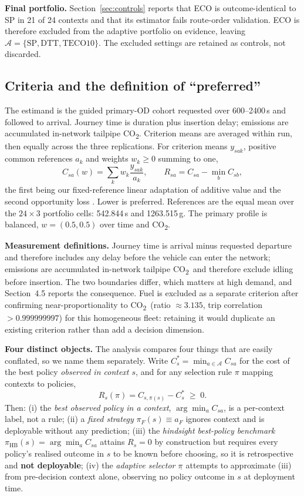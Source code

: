 \documentclass[10pt,a4paper]{article}
\newcommand{\CO}{CO\textsubscript{2}}
\begin{document}
\textbf{Final portfolio.} Section~\ref{sec:controls} reports that ECO is outcome-identical to SP in 21 of 24 contexts and that its estimator fails route-order validation. ECO is therefore excluded from the adaptive portfolio on evidence, leaving $\mathcal A=\{\mathrm{SP},\mathrm{DTT},\mathrm{TECO}10\}$. The excluded settings are retained as controls, not discarded.

\subsection{Criteria and the definition of ``preferred''}
The estimand is the guided primary-OD cohort requested over 600--2400\,s and followed to arrival. Journey time is duration plus insertion delay; emissions are accumulated in-network tailpipe \CO. Criterion means are averaged within run, then equally across the three replications. For criterion means $y_{sak}$, positive common references $a_k$ and weights $w_k\ge0$ summing to one,
\begin{equation}
C_{sa}(w)=\sum_k w_k\frac{y_{sak}}{a_k},\qquad
R_{sa}=C_{sa}-\min_b C_{sb},
\label{eq:cost}
\end{equation}
the first being our fixed-reference linear adaptation of additive value \cite{keeney1993decisions} and the second opportunity loss \cite{kouvelis1997robust}. Lower is preferred. References are the equal mean over the $24\times3$ portfolio cells: 542.844\,s and 1263.515\,g. The primary profile is balanced, $w=(0.5,0.5)$ over time and \CO.

\textbf{Measurement definitions.} Journey time is arrival minus requested departure and therefore includes any delay before the vehicle can enter the network; emissions are accumulated in-network tailpipe \CO\ and therefore exclude idling before insertion. The two boundaries differ, which matters at high demand, and Section~4.5 reports the consequence. Fuel is excluded as a separate criterion after confirming near-proportionality to \CO\ (ratio $\approx3.135$, trip correlation $>0.999999997$) for this homogeneous fleet: retaining it would duplicate an existing criterion rather than add a decision dimension.

\textbf{Four distinct objects.} The analysis compares four things that are easily conflated, so we name them separately. Write $C^*_s=\min_{a\in\mathcal A}C_{sa}$ for the cost of the best policy \emph{observed in context $s$}, and for any selection rule $\pi$ mapping contexts to policies,
\begin{equation}
R_s(\pi)=C_{s,\pi(s)}-C^*_s \;\ge\; 0 .
\label{eq:regret}
\end{equation}
Then: (i) the \emph{best observed policy in a context}, $\arg\min_a C_{sa}$, is a per-context label, not a rule; (ii) a \emph{fixed strategy} $\pi_F(s)\equiv a_F$ ignores context and is deployable without any prediction; (iii) the \emph{hindsight best-policy benchmark} $\pi_{\mathrm{HB}}(s)=\arg\min_a C_{sa}$ attains $R_s=0$ by construction but requires every policy's realised outcome in $s$ to be known before choosing, so it is retrospective and \textbf{not deployable}; (iv) the \emph{adaptive selector} $\pi_{\widehat{}}$ attempts to approximate (iii) from pre-decision context alone, observing no policy outcome in $s$ at deployment time.
\end{document}

